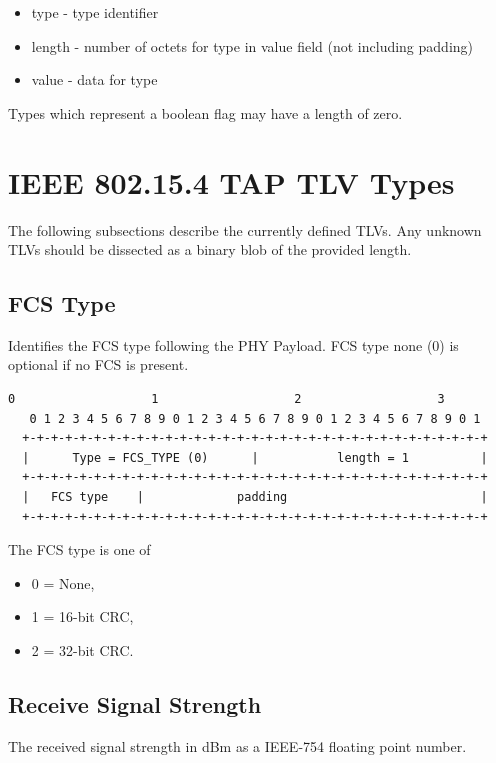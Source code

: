 \documentclass[12pt]{article}
\renewcommand\_{\textunderscore\allowbreak}
\begin{document}
\begin{itemize}
    \item type        - type identifier
    \item length      - number of octets for type in value field
                        (not including padding)
    \item value       - data for type
\end{itemize}
Types which represent a boolean flag may have a length of zero.

\newpage
\section{IEEE 802.15.4 TAP TLV Types}

The following subsections describe the currently defined TLVs.  Any unknown
TLVs should be dissected as a binary blob of the provided length.

\subsection{FCS Type}

Identifies the FCS type following the PHY Payload.  FCS type none (0) is
optional if no FCS is present.

\begin{Verbatim}[samepage=true]
   0                   1                   2                   3
   0 1 2 3 4 5 6 7 8 9 0 1 2 3 4 5 6 7 8 9 0 1 2 3 4 5 6 7 8 9 0 1
  +-+-+-+-+-+-+-+-+-+-+-+-+-+-+-+-+-+-+-+-+-+-+-+-+-+-+-+-+-+-+-+-+
  |      Type = FCS_TYPE (0)      |           length = 1          |
  +-+-+-+-+-+-+-+-+-+-+-+-+-+-+-+-+-+-+-+-+-+-+-+-+-+-+-+-+-+-+-+-+
  |   FCS type    |             padding                           |
  +-+-+-+-+-+-+-+-+-+-+-+-+-+-+-+-+-+-+-+-+-+-+-+-+-+-+-+-+-+-+-+-+
\end{Verbatim}

The FCS type is one of
    \begin{itemize}
        \item 0 = None,
        \item 1 = 16-bit CRC,
        \item 2 = 32-bit CRC.
    \end{itemize}

\subsection{Receive Signal Strength}
The received signal strength in dBm as a IEEE-754 floating point number.
\end{document}
